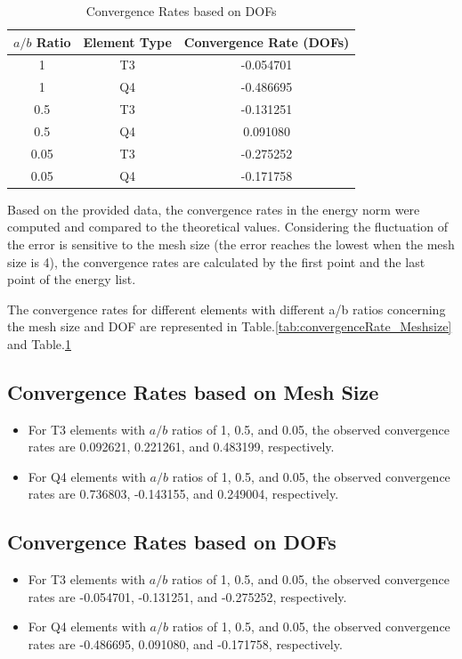 \documentclass[twoside,twocolumn,10pt]{article}
\begin{document}
\begin{table}[h]
    \centering
    \caption{Convergence Rates based on DOFs}
    \begin{tabular}{|c|c|c|}
    \hline
    \(a/b\) Ratio & Element Type & Convergence Rate (DOFs) \\
    \hline
    1 & T3 & -0.054701 \\
    1 & Q4 & -0.486695 \\
    0.5 & T3 & -0.131251 \\
    0.5 & Q4 & 0.091080 \\
    0.05 & T3 & -0.275252 \\
    0.05 & Q4 & -0.171758 \\
    \hline
    \end{tabular}
  \label{tab:convergenceRate_DOF}
\end{table}

Based on the provided data, the convergence rates in the energy norm were computed and compared to the theoretical values. Considering the fluctuation of the error is sensitive to the mesh size (the error reaches the lowest when the mesh size is 4), the convergence rates are calculated by the first point and the last point of the energy list.

The convergence rates for different elements with different a/b ratios concerning the mesh size and DOF are represented in Table.\ref{tab:convergenceRate_Meshsize} and Table.\ref{tab:convergenceRate_DOF}

\subsection*{Convergence Rates based on Mesh Size}

\begin{itemize}
    \item For T3 elements with \(a/b\) ratios of 1, 0.5, and 0.05, the observed convergence rates are 0.092621, 0.221261, and 0.483199, respectively.
    \item For Q4 elements with \(a/b\) ratios of 1, 0.5, and 0.05, the observed convergence rates are 0.736803, -0.143155, and 0.249004, respectively.
\end{itemize}

\subsection*{Convergence Rates based on DOFs}

\begin{itemize}
    \item For T3 elements with \(a/b\) ratios of 1, 0.5, and 0.05, the observed convergence rates are -0.054701, -0.131251, and -0.275252, respectively. 
    \item For Q4 elements with \(a/b\) ratios of 1, 0.5, and 0.05, the observed convergence rates are -0.486695, 0.091080, and -0.171758, respectively. 
\end{itemize}
\end{document}
